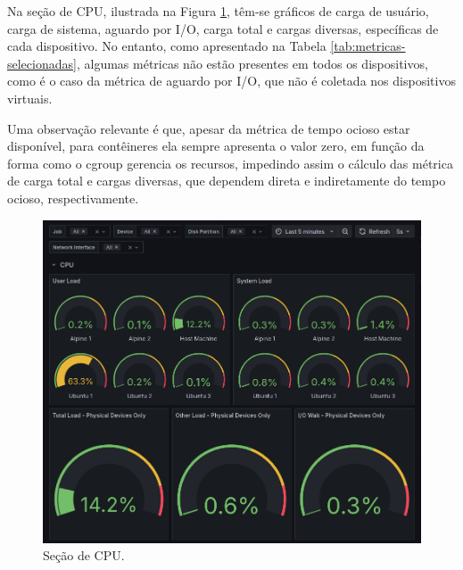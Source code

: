 Na seção de CPU, ilustrada na Figura \ref{fig:dashboard-cpu}, 
têm-se gráficos de carga de usuário, carga de sistema, aguardo por I/O, carga total e cargas diversas, específicas de cada dispositivo. No entanto, como apresentado na Tabela \ref{tab:metricas-selecionadas}, algumas métricas não estão presentes em todos os dispositivos, como é o caso da métrica de aguardo por I/O, que não é coletada nos dispositivos virtuais.

Uma observação relevante é que, apesar da métrica de tempo ocioso estar disponível, para contêineres ela sempre apresenta o valor zero, em função da forma como o cgroup gerencia os recursos, impedindo assim o cálculo das métrica de carga total e cargas diversas, que dependem direta e indiretamente do tempo ocioso, respectivamente.

\begin{figure}[H]
\centering
\setlength{\abovecaptionskip}{-20pt}
\includegraphics[width=\textwidth]{Imagens/chap04/dashboard/cpu.png}
\caption{Seção de CPU.}
\label{fig:dashboard-cpu}
\end{figure}

